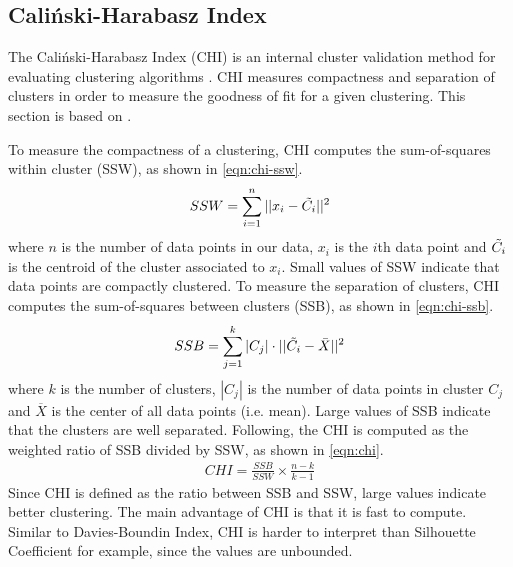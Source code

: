 \subsection{Caliński-Harabasz Index}
\label{sec:calinski-harabasz-index}
The Caliński-Harabasz Index (CHI) is an internal cluster validation method for evaluating clustering algorithms \cite{CalinskiHarabasz1974}. CHI measures compactness and separation of clusters in order to measure the goodness of fit for a given clustering. This section is based on \cite{CalinskiHarabasz1974}.

To measure the compactness of a clustering, CHI computes the sum-of-squares within cluster (SSW), as shown in \cref{eqn:chi-ssw}.
\begin{align}
    SSW = \sum\limits_{i=1}^{n} ||x_i - \Tilde{C_i}||^2
    \label{eqn:chi-ssw}
\end{align}
where $n$ is the number of data points in our data, $x_i$ is the $i$th data point and $\Tilde{C_i}$ is the centroid of the cluster associated to $x_i$. Small values of SSW indicate that data points are compactly clustered. To measure the separation of clusters, CHI computes the sum-of-squares between clusters (SSB), as shown in \cref{eqn:chi-ssb}.
\begin{align}
    SSB = \sum\limits_{j=1}^{k} |C_j| \cdot ||\Tilde{C_i} - \Bar{X}||^2
    \label{eqn:chi-ssb}
\end{align}
where $k$ is the number of clusters, $|C_j|$ is the number of data points in cluster $C_j$ and $\overline{X}$ is the center of all data points (i.e. mean). Large values of SSB indicate that the clusters are well separated. Following, the CHI is computed as the weighted ratio of SSB divided by SSW, as shown in \cref{eqn:chi}.
\begin{align}
    CHI = \frac{SSB}{SSW} \times \frac{n - k}{k - 1}
    \label{eqn:chi}
\end{align}
Since CHI is defined as the ratio between SSB and SSW, large values indicate better clustering. The main advantage of CHI is that it is fast to compute. Similar to Davies-Boundin Index, CHI is harder to interpret than Silhouette Coefficient for example, since the values are unbounded.


